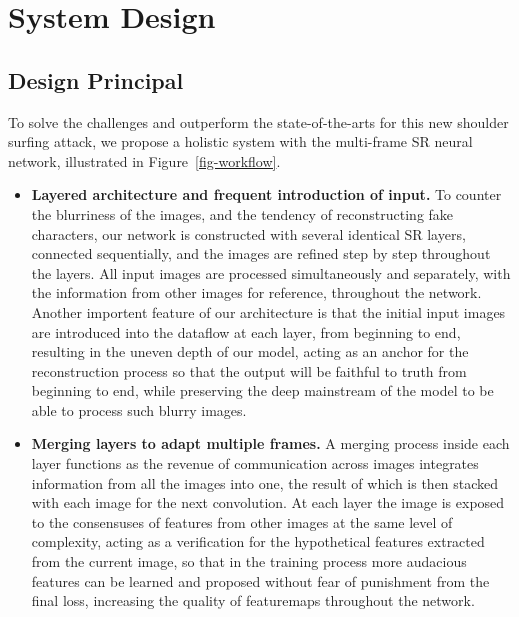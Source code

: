 \section{System Design}
\label{sec-design}

\subsection{Design Principal}
To solve the challenges and outperform the state-of-the-arts for this new shoulder surfing attack, we propose a holistic system with the multi-frame SR neural network, illustrated in Figure~\ref{fig-workflow}.

\begin{itemize}[leftmargin=*]
    \item \textbf{Layered architecture and frequent introduction of input.} To counter the blurriness of the images, and the tendency of reconstructing fake characters, our network is constructed with several identical SR layers, connected sequentially, and the images are refined step by step throughout the layers. All input images are processed simultaneously and separately, with the information from other images for reference, throughout the network. Another importent feature of our architecture is that the initial input images are introduced into the dataflow at each layer, from beginning to end, resulting in the uneven depth of our model, acting as an anchor for the reconstruction process so that the output will be faithful to truth from beginning to end, while preserving the deep mainstream of the model to be able to process such blurry images.
    \item \textbf{Merging layers to adapt multiple frames.} A merging process inside each layer functions as the revenue of communication across images integrates information from all the images into one, the result of which is then stacked with each image for the next convolution. At each layer the image is exposed to the consensuses of features from other images at the same level of complexity, acting as a verification for the hypothetical features extracted from the current image, so that in the training process more audacious features can be learned and proposed without fear of punishment from the final loss, increasing the quality of featuremaps throughout the network.

\end{itemize}
